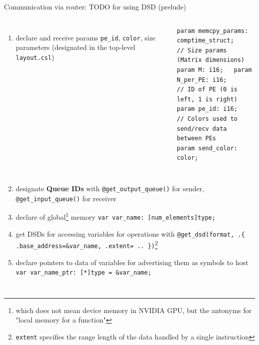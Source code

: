 \documentclass[dvipdfmx, 11pt, aspectratio=169]{beamer}   %
\begin{document}
\begin{frame}[fragile]{Communication via router: TODO for using DSD (prelude)}
\begin{columns}
\begin{enumerate}
    \item declare and receive params \lstinline|pe_id|, \lstinline|color|, size parameters (designated in the top-level \lstinline|layout.csl|)
\end{enumerate}
\begin{lstlisting}[language=CSL, basicstyle=\ttfamily\tiny]
param memcpy_params: comptime_struct;
// Size params (Matrix dimensions)
param M: i16;   param N_per_PE: i16;
// ID of PE (0 is left, 1 is right)
param pe_id: i16;
// Colors used to send/recv data between PEs
param send_color: color;
\end{lstlisting}
\end{columns}\vspace{-0.7\baselineskip}
\begin{columns}
\begin{enumerate}\setcounter{enumi}{1}
    \item designate \textbf{Queue IDs} with \lstinline|@get_output_queue()| for sender, \lstinline|@get_input_queue()| for receiver
    \item declare of global\footnote{which does not mean device memory in NVIDIA GPU, but the antonyms for "local memory for a function"} memory \lstinline|var var_name: [num_elements]type;|
    \item get DSDs for accessing variables for operations with \lstinline|@get_dsd(format, .{ .base_address=&var_name, .extent= .. })|\footnote{\lstinline|extent| specifies the range length of the data handled by a single instruction}
    \item declare pointers to data of variables for advertising them as symbols to host \lstinline|var var_name_ptr: [*]type = &var_name;|
\end{enumerate}
\end{columns}
\end{frame}
\end{document}

